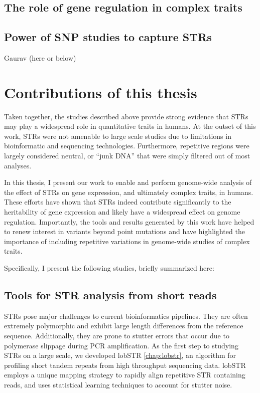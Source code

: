 \subsection{The role of gene regulation in complex traits}
\subsection{Power of SNP studies to capture STRs}
Gaurav (here or below)

\section{Contributions of this thesis}
Taken together, the studies described above provide strong evidence that STRs may play a widespread role in quantitative traits in humans. At the outset of this work, STRs were not amenable to large scale studies due to limitations in bioinformatic and sequencing technologies. Furthermore, repetitive regions were largely considered neutral, or ``junk DNA'' that were simply filtered out of most analyses.

In this thesis, I present our work to enable and perform genome-wide analysis of the effect of STRs on gene expression, and ultimately complex traits, in humans. These efforts have shown that STRs indeed contribute significantly to the heritability of gene expression and likely have a widespread effect on genome regulation. Importantly, the tools and results generated by this work have helped to renew interest in variants beyond point mutations and have highlighted the importance of including repetitive variations in genome-wide studies of complex traits. 

Specifically, I present the following studies, briefly summarized here:

\subsection{Tools for STR analysis from short reads}
STRs pose major challenges to current bioinformatics pipelines. They are often extremely polymorphic and exhibit large length differences from the reference sequence. Additionally, they are prone to stutter errors that occur due to polymerase slippage during PCR amplification. As the first step to studying STRs on a large scale, we developed lobSTR \cite{GymrekGolanRossetEtAl2012} \autoref{chap:lobstr}, an algorithm for profiling short tandem repeats from high throughput sequencing data. lobSTR employs a unique mapping strategy to rapidly align repetitive STR containing reads, and uses statistical learning techniques to account for stutter noise.

